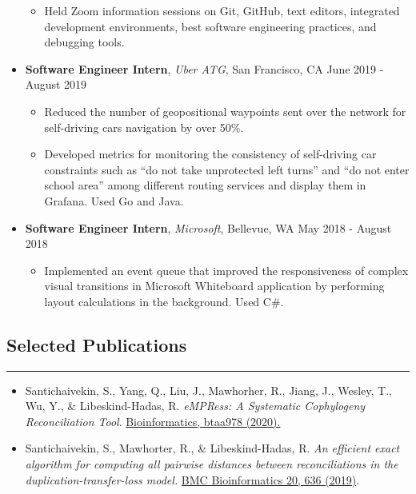 \documentclass[10pt,letterpaper]{article}
\begin{document}
\begin{itemize}[label={},leftmargin=*]
\begin{itemize}[label=\textbullet]
      \item Held Zoom information sessions on Git, GitHub, text editors, integrated development environments, best software engineering practices, and debugging tools.
    \end{itemize}
    \item
    {\textbf{Software Engineer Intern}, \textit{Uber ATG}, San Francisco, CA \hfill {June 2019 - August 2019}}
    \begin{itemize}[label=\textbullet]
      \itemsep0em
      \item Reduced the number of geopositional waypoints sent over the network for self-driving cars navigation by over 50\%.
      \item Developed metrics for monitoring the consistency of self-driving car constraints such as ``do not take unprotected left turns'' and ``do not enter school area'' among different routing services and display them in Grafana. Used Go and Java.
    \end{itemize}
    \item
    {\textbf{Software Engineer Intern}, \textit{Microsoft}, Bellevue, WA \hfill {May 2018 - August 2018}}
    \begin{itemize}[label=\textbullet]
      \itemsep0em
      \item Implemented an event queue that improved the responsiveness of complex visual transitions in Microsoft Whiteboard application by performing layout calculations in the background. Used C\#.
    \end{itemize}
  \end{itemize}


\subsection*{Selected Publications}
\vspace{-0.2em}
\hrule
\vspace{1em}
\begin{itemize}[label={},leftmargin=*]
  \setlength\itemsep{0.8em}
    \parskip=-0.2em
  \item Santichaivekin, S., Yang, Q., Liu, J., Mawhorher, R., Jiang, J., Wesley, T., Wu, Y., \& Libeskind-Hadas, R. \textit{eMPRess: A Systematic Cophylogeny Reconciliation Tool}. \href{https://doi.org/10.1093/bioinformatics/btaa978}{Bioinformatics, btaa978 (2020).}
  \item Santichaivekin, S., Mawhorter, R., \& Libeskind-Hadas, R. \textit{An efficient exact algorithm for computing all pairwise distances between reconciliations in the duplication-transfer-loss model.} \href{https://doi.org/10.1186/s12859-019-3203-9}{BMC Bioinformatics 20, 636 (2019)}.
\end{itemize}
\end{document}
